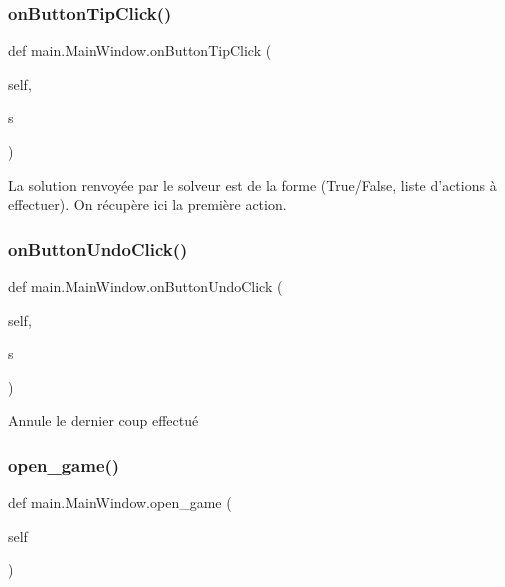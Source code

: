 \subsubsection{\texorpdfstring{on\+Button\+Tip\+Click()}{onButtonTipClick()}}
{\footnotesize\ttfamily def main.\+Main\+Window.\+on\+Button\+Tip\+Click (\begin{DoxyParamCaption}\item[{}]{self,  }\item[{}]{s }\end{DoxyParamCaption})}

\begin{DoxyVerb}La solution renvoyée par le solveur est de la forme (True/False, liste d'actions à effectuer).
On récupère ici la première action.\end{DoxyVerb}
 \mbox{\label{classmain_1_1MainWindow_a2acd695c824c327fa90308bc2ee511f3}} 
\subsubsection{\texorpdfstring{on\+Button\+Undo\+Click()}{onButtonUndoClick()}}
{\footnotesize\ttfamily def main.\+Main\+Window.\+on\+Button\+Undo\+Click (\begin{DoxyParamCaption}\item[{}]{self,  }\item[{}]{s }\end{DoxyParamCaption})}

\begin{DoxyVerb}Annule le dernier coup effectué \end{DoxyVerb}
 \mbox{\label{classmain_1_1MainWindow_a841e6a28b64e63e03be4fd0073a38ce4}} 
\subsubsection{\texorpdfstring{open\+\_\+game()}{open\_game()}}
{\footnotesize\ttfamily def main.\+Main\+Window.\+open\+\_\+game (\begin{DoxyParamCaption}\item[{}]{self }\end{DoxyParamCaption})}

